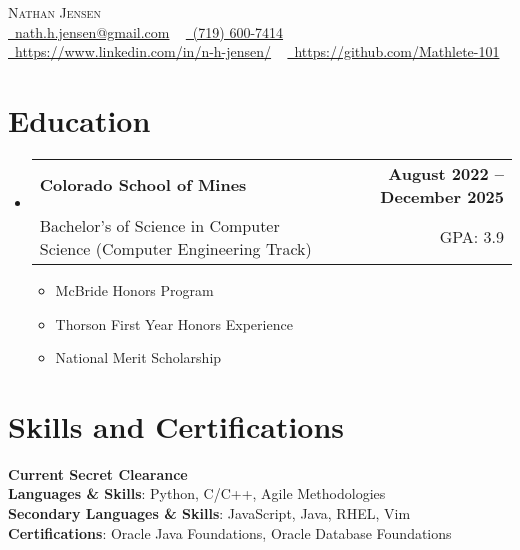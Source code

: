 \documentclass[11pt, letterpaper]{article}
\makeatletter
\newcommand{\resumeItem}[1]{
  \item\small{
    {#1 \vspace{-2pt}}
  }
}
\newcommand{\resumeSubheading}[4]{
  \vspace{-2pt}\item
    \begin{tabular*}{1.0\textwidth}[t]{l@{\extracolsep{\fill}}r}
      \textbf{#1} & \textbf{\small #2} \\
      {\small#3} & {\small #4} \\
    \end{tabular*}\vspace{-7pt}
}
\newcommand{\resumeSubHeadingListStart}{\begin{itemize}[leftmargin=0.0in, label={}]}
\newcommand{\resumeSubHeadingListEnd}{\end{itemize}}
\newcommand{\resumeItemListStart}{\begin{itemize}}
\newcommand{\resumeItemListEnd}{\end{itemize}\vspace{-5pt}}
\makeatother
\begin{document}
\begin{center}
    {
    \huge \scshape Nathan Jensen} \\ \vspace{4pt}
    \small
    \href{mailto:nath.h.jensen@gmail.com}{\faEnvelope\ nath.h.jensen@gmail.com} ~
    \href{tel:7196007414}{\faPhone\ (719) 600-7414} ~ \\
    \vspace{2pt}
    \href{https://www.linkedin.com/in/n-h-jensen/}{\faLinkedin\ https://www.linkedin.com/in/n-h-jensen/}  ~
    \href{https://github.com/Mathlete-101}{\faGithub\ https://github.com/Mathlete-101}
    \vspace{-5pt}
\end{center}



\section{Education}   %
  \resumeSubHeadingListStart
    \resumeSubheading
      {Colorado School of Mines}{August 2022 -- December 2025}
      {Bachelor's of Science in Computer Science (Computer Engineering Track)}{GPA: 3.9}
      \resumeItemListStart
        \resumeItem{McBride Honors Program}
        \resumeItem{Thorson First Year Honors Experience}
        \resumeItem{National Merit Scholarship}
    \resumeItemListEnd
    \resumeSubHeadingListEnd

\section{Skills and Certifications}   %
 \begin{itemize}[leftmargin=0.1in, label={}]
    \small{\item{
      \textbf{Current Secret Clearance}\\
      \textbf{Languages \& Skills}{: Python, C/C++, Agile Methodologies} \\
      \textbf{Secondary Languages \& Skills}{: JavaScript, Java, RHEL, Vim}\\
      \textbf{Certifications}{: Oracle Java Foundations, Oracle Database Foundations}\\
    }}
 \end{itemize}
\end{document}
